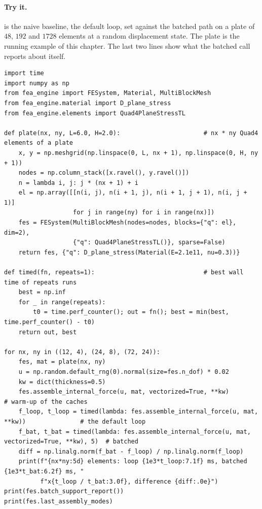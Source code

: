 \paragraph{Try it.}  is the naive baseline, the default loop, set against the batched path on a plate of $48$, $192$ and $1728$  elements at a random displacement state. The plate is the running example of this chapter. The last two lines show what the batched call reports about itself.

\begin{lstlisting}[caption={The default element loop against batched assembly of the internal force of a plate (run with the package on the path).},label={lst:bk-try}]
import time
import numpy as np
from fea_engine import FESystem, Material, MultiBlockMesh
from fea_engine.material import D_plane_stress
from fea_engine.elements import Quad4PlaneStressTL

def plate(nx, ny, L=6.0, H=2.0):                       # nx * ny Quad4 elements of a plate
    x, y = np.meshgrid(np.linspace(0, L, nx + 1), np.linspace(0, H, ny + 1))
    nodes = np.column_stack([x.ravel(), y.ravel()])
    n = lambda i, j: j * (nx + 1) + i
    el = np.array([[n(i, j), n(i + 1, j), n(i + 1, j + 1), n(i, j + 1)]
                   for j in range(ny) for i in range(nx)])
    fes = FESystem(MultiBlockMesh(nodes=nodes, blocks={"q": el}, dim=2),
                   {"q": Quad4PlaneStressTL()}, sparse=False)
    return fes, {"q": D_plane_stress(Material(E=2.1e11, nu=0.3))}

def timed(fn, repeats=1):                              # best wall time of repeats runs
    best = np.inf
    for _ in range(repeats):
        t0 = time.perf_counter(); out = fn(); best = min(best, time.perf_counter() - t0)
    return out, best

for nx, ny in ((12, 4), (24, 8), (72, 24)):
    fes, mat = plate(nx, ny)
    u = np.random.default_rng(0).normal(size=fes.n_dof) * 0.02
    kw = dict(thickness=0.5)
    fes.assemble_internal_force(u, mat, vectorized=True, **kw)            # warm-up of the caches
    f_loop, t_loop = timed(lambda: fes.assemble_internal_force(u, mat, **kw))               # the default loop
    f_bat, t_bat = timed(lambda: fes.assemble_internal_force(u, mat, vectorized=True, **kw), 5)  # batched
    diff = np.linalg.norm(f_bat - f_loop) / np.linalg.norm(f_loop)
    print(f"{nx*ny:5d} elements: loop {1e3*t_loop:7.1f} ms, batched {1e3*t_bat:6.2f} ms, "
          f"x{t_loop / t_bat:3.0f}, difference {diff:.0e}")
print(fes.batch_support_report())
print(fes.last_assembly_modes)
\end{lstlisting}


